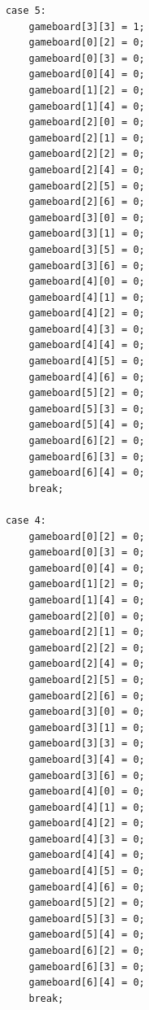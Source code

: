 \documentclass{article}
\begin{document}
\begin{lstlisting}
            case 5:
                gameboard[3][3] = 1;
                gameboard[0][2] = 0;
                gameboard[0][3] = 0;
                gameboard[0][4] = 0;
                gameboard[1][2] = 0;
                gameboard[1][4] = 0;
                gameboard[2][0] = 0;
                gameboard[2][1] = 0;
                gameboard[2][2] = 0;
                gameboard[2][4] = 0;
                gameboard[2][5] = 0;
                gameboard[2][6] = 0;
                gameboard[3][0] = 0;
                gameboard[3][1] = 0;
                gameboard[3][5] = 0;
                gameboard[3][6] = 0;
                gameboard[4][0] = 0;
                gameboard[4][1] = 0;
                gameboard[4][2] = 0;
                gameboard[4][3] = 0;
                gameboard[4][4] = 0;
                gameboard[4][5] = 0;
                gameboard[4][6] = 0;
                gameboard[5][2] = 0;
                gameboard[5][3] = 0;
                gameboard[5][4] = 0;
                gameboard[6][2] = 0;
                gameboard[6][3] = 0;
                gameboard[6][4] = 0;
                break;

            case 4:
                gameboard[0][2] = 0;
                gameboard[0][3] = 0;
                gameboard[0][4] = 0;
                gameboard[1][2] = 0;
                gameboard[1][4] = 0;
                gameboard[2][0] = 0;
                gameboard[2][1] = 0;
                gameboard[2][2] = 0;
                gameboard[2][4] = 0;
                gameboard[2][5] = 0;
                gameboard[2][6] = 0;
                gameboard[3][0] = 0;
                gameboard[3][1] = 0;
                gameboard[3][3] = 0;
                gameboard[3][4] = 0;
                gameboard[3][6] = 0;
                gameboard[4][0] = 0;
                gameboard[4][1] = 0;
                gameboard[4][2] = 0;
                gameboard[4][3] = 0;
                gameboard[4][4] = 0;
                gameboard[4][5] = 0;
                gameboard[4][6] = 0;
                gameboard[5][2] = 0;
                gameboard[5][3] = 0;
                gameboard[5][4] = 0;
                gameboard[6][2] = 0;
                gameboard[6][3] = 0;
                gameboard[6][4] = 0;
                break;


\end{lstlisting}
\end{document}
